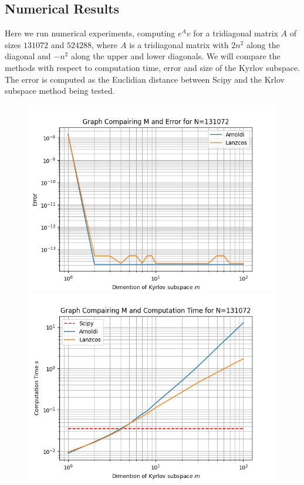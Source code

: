 \documentclass{article}
\begin{document}
\subsection{Numerical Results}
Here we run numerical experiments, computing $e^Av$ for a tridiagonal matrix $A$ of sizes $131072$ and $524288$, where $A$ is a tridiagonal matrix with $2n^2$ along the diagonal and $-n^2$ along the upper and lower diagonals. We will compare the methods with respect to computation time, error and size of the Kyrlov subspace. The error is computed as the Euclidian distance between Scipy and the Krlov subspace method being tested.

\begin{figure}[H]
    \centering
    \begin{minipage}{0.5\textwidth}
       \centering
	  \includegraphics[width=\linewidth]{Plots/M v E Results for N=131072.png}
	  \label{fig:MEe7}
       \centering
	  \includegraphics[width=\linewidth]{Plots/M v Comp Time Results for N=131072.png}

\end{minipage}
\end{figure}
\end{document}
